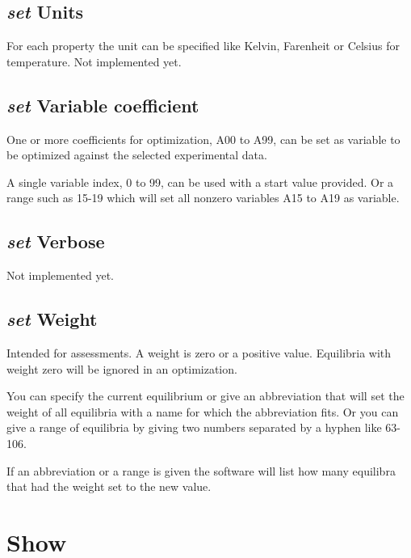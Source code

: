 \documentclass[11pt]{article}
\begin{document}
\hypertarget{Set units}{}
\subsection{{\em set} Units}

For each property the unit can be specified like Kelvin, Farenheit or
Celsius for temperature.  Not implemented yet.

\hypertarget{Set variable coeff}{}
\subsection{{\em set} Variable coefficient}\label{sc:setvar}

One or more coefficients for optimization, A00 to A99, can be set as
variable to be optimized against the selected experimental data.

A single variable index, 0 to 99, can be used with a start value
provided.  Or a range such as 15-19 which will set all nonzero
variables A15 to A19 as variable.

\hypertarget{Set verbose}{}
\subsection{{\em set} Verbose}

Not implemented yet.

\hypertarget{Set weight}{}
\subsection{{\em set} Weight}\label{sc:setw}

Intended for assessments.  A weight is zero or a positive value.
Equilibria with weight zero will be ignored in an optimization.  

You can specify the current equilibrium or give an abbreviation that
will set the weight of all equilibria with a name for which the
abbreviation fits.  Or you can give a range of equilibria by giving
two numbers separated by a hyphen like 63-106.

If an abbreviation or a range is given the software will list how many
equilibra that had the weight set to the new value.

\hypertarget{Show property}{}
\section{Show }\label{sc:show}
\end{document}
